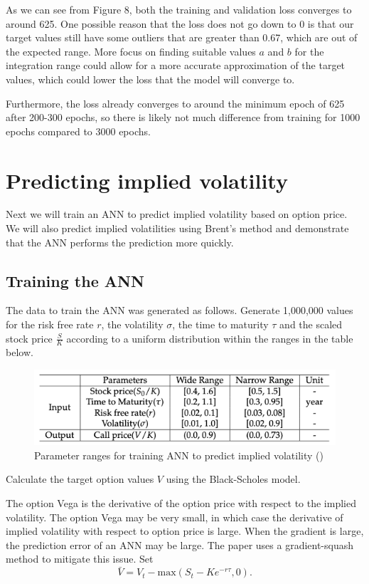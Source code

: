 \documentclass[12pt,a4paper]{article}
\begin{document}
As we can see from Figure 8, both the training and validation loss converges to around 625. One possible reason that the loss does not go down to 0 is that our target values still have some outliers that are greater than 0.67, which are out of the expected range. More focus on finding suitable values $a$ and $b$ for the integration range could allow for a more accurate approximation of the target values, which could lower the loss that the model will converge to. 

Furthermore, the loss already converges to around the minimum epoch of 625 after 200-300 epochs, so there is likely not much difference from training for 1000 epochs compared to 3000 epochs.

\section{Predicting implied volatility}
Next we will train an ANN to predict implied volatility based on option price. We will also predict implied volatilities using Brent's method and demonstrate that the ANN performs the prediction more quickly.

\subsection{Training the ANN}
The data to train the ANN was generated as follows. Generate 1,000,000 values for the risk free rate $r$, the volatility $\sigma$, the time to maturity $\tau$ and the scaled stock price $\frac{S}{K}$ according to a uniform distribution within the ranges in the table below.

\begin{figure}[H]
    \centering
    \includegraphics[width=370pt]{Black-Scholes parameter ranges.png}
    \caption{Parameter ranges for training ANN to predict implied volatility (\cite{risks7010016})}
\end{figure}

Calculate the target option values $V$ using the Black-Scholes model.

The option Vega is the derivative of the option price with respect to the implied volatility. The option Vega may be very small, in which case the derivative of implied volatility with respect to option price is large. When the gradient is large, the prediction error of an ANN may be large. The paper \cite{risks7010016} uses a gradient-squash method to mitigate this issue. Set
\[ \bar{V} = V_t - \text{max}(S_t-Ke^{-r\tau}, 0). \]
\end{document}
